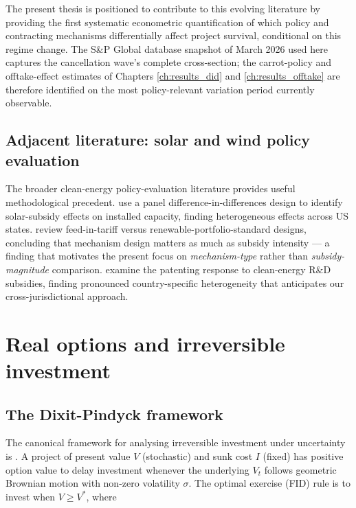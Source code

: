 The present thesis is positioned to contribute to this evolving literature by providing the first systematic econometric quantification of which policy and contracting mechanisms differentially affect project survival, conditional on this regime change. The S\&P Global database snapshot of March 2026 used here captures the cancellation wave's complete cross-section; the carrot-policy and offtake-effect estimates of Chapters \ref{ch:results_did} and \ref{ch:results_offtake} are therefore identified on the most policy-relevant variation period currently observable.

\subsection{Adjacent literature: solar and wind policy evaluation}

The broader clean-energy policy-evaluation literature provides useful methodological precedent. \cite{bento2018solar} use a panel difference-in-differences design to identify solar-subsidy effects on installed capacity, finding heterogeneous effects across US states. \cite{aldy2016environment} review feed-in-tariff versus renewable-portfolio-standard designs, concluding that mechanism design matters as much as subsidy intensity --- a finding that motivates the present focus on \emph{mechanism-type} rather than \emph{subsidy-magnitude} comparison. \cite{popp2010innovation} examine the patenting response to clean-energy R\&D subsidies, finding pronounced country-specific heterogeneity that anticipates our cross-jurisdictional approach.

\section{Real options and irreversible investment}
\label{sec:lit_realoptions}

\subsection{The Dixit-Pindyck framework}

The canonical framework for analysing irreversible investment under uncertainty is \cite{dixit1994investment}. A project of present value $V$ (stochastic) and sunk cost $I$ (fixed) has positive option value to delay investment whenever the underlying $V_t$ follows geometric Brownian motion with non-zero volatility $\sigma$. The optimal exercise (FID) rule is to invest when $V \geq V^*$, where

